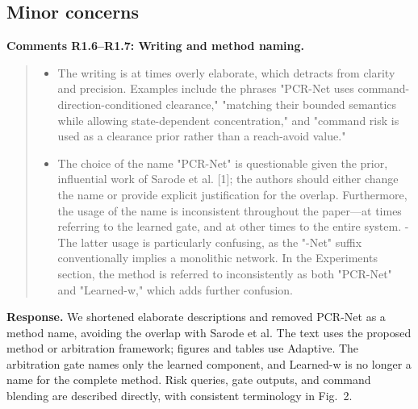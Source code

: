 \documentclass[letterpaper,11pt]{article}
\begin{document}
\subsection*{Minor concerns}
\noindent\textbf{Comments R1.6--R1.7: Writing and method naming.}
\begin{quote}\color{reviewgray}
\begin{itemize}[leftmargin=*,nosep,label={}]
\item[\textbf{R1.6.}] The writing is at times overly elaborate, which detracts from clarity and precision. Examples include the phrases "PCR-Net uses command-direction-conditioned clearance," "matching their bounded semantics while allowing state-dependent concentration," and "command risk is used as a clearance prior rather than a reach-avoid value."
\item[\textbf{R1.7.}] The choice of the name "PCR-Net" is questionable given the prior, influential work of Sarode et al. [1]; the authors should either change the name or provide explicit justification for the overlap. Furthermore, the usage of the name is inconsistent throughout the paper—at times referring to the learned gate, and at other times to the entire system. - The latter usage is particularly confusing, as the "-Net" suffix conventionally implies a monolithic network. In the Experiments section, the method is referred to inconsistently as both "PCR-Net" and "Learned-w," which adds further confusion.
\end{itemize}
\end{quote}
\noindent\textbf{Response.}
We shortened elaborate descriptions and removed PCR-Net as a method name, avoiding the overlap with Sarode et al. The text uses the proposed method or arbitration framework; figures and tables use Adaptive. The arbitration gate names only the learned component, and Learned-w is no longer a name for the complete method. Risk queries, gate outputs, and command blending are described directly, with consistent terminology in Fig.~2.
\par\nopagebreak[4]
\end{document}
